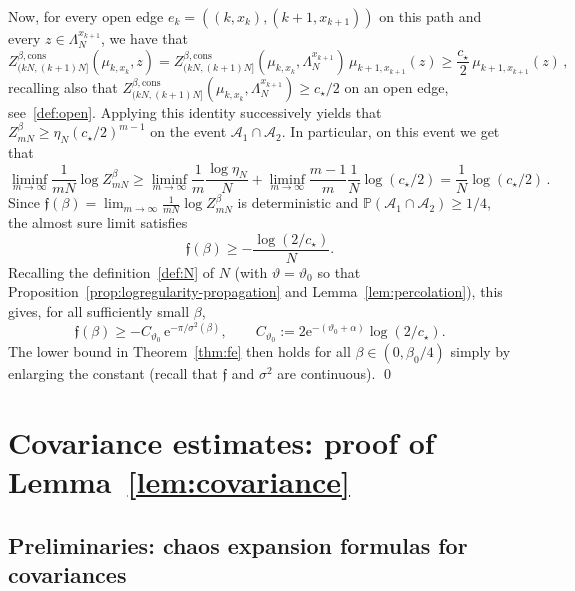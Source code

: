 \documentclass[11pt]{amsart}
\numberwithin{equation}{section}
\newcommand{\e}{\mathrm{e}}
\newcommand*{\tf}{\mathfrak{f}}
\newcommand*{\cons}{\mathrm{cons}}
\theoremstyle{plain}
\theoremstyle{definition}
\theoremstyle{remark}
\begin{document}
Now, for every open edge $e_k=((k,x_k),(k+1,x_{k+1}))$ on this path and every $z\in\Lambda_N^{x_{k+1}}$, we have that
$$
Z_{(kN,(k+1)N]}^{\beta,\cons}(\mu_{k,x_k},z)
=Z_{(kN,(k+1)N]}^{\beta,\cons}(\mu_{k,x_k},\Lambda_N^{x_{k+1}}) \, \mu_{k+1,x_{k+1}}(z)
\ge \frac{c_\star}{2}\, \mu_{k+1,x_{k+1}}(z) \,,
$$
recalling also that \(Z_{(kN,(k+1)N]}^{\beta,\cons}(\mu_{k,x_k},\Lambda_N^{x_{k+1}}) \geq c_{\star}/2\) on an open edge, see~\eqref{def:open}.
Applying this identity successively yields that \(Z_{mN}^{\beta} \ge \eta_N (c_{\star}/2)^{m-1}\) on the event $\mathcal A_1\cap \mathcal A_2$.
In particular, on this event we get that 
$$
\liminf_{m\to\infty} \frac{1}{mN} \log Z_{mN}^{\beta} \geq \liminf_{m\to\infty} \frac{1}{m} \frac{\log \eta_N}{ N} + \liminf_{m\to\infty} \frac{m-1}{m} \frac{1}{N}\log (c_{\star}/2) =\frac{1}{N}\log (c_{\star}/2) \,.
$$
Since $\tf(\beta) = \lim_{m\to\infty} \frac{1}{mN} \log Z_{mN}^{\beta}$ is deterministic and $\mathbb P(\mathcal A_1\cap \mathcal A_2)\geq 1/4$, the almost sure limit satisfies
$$
\tf(\beta) \geq -\frac{\log(2/c_\star)}{N}.
$$
Recalling the definition~\eqref{def:N} of $N$ (with \(\vartheta =\vartheta_0\) so that Proposition~\ref{prop:logregularity-propagation} and Lemma~\ref{lem:percolation}), this gives, for all sufficiently small $\beta$,
\[
\tf(\beta)\ge -C_{\vartheta_0} \,\e^{-\pi/\sigma^2(\beta)},
\qquad
C_{\vartheta_0}:=2\e^{-(\vartheta_0+\alpha)}\log(2/c_\star).
\]
The lower bound in Theorem~\ref{thm:fe} then holds for all \(\beta\in (0,\beta_0/4)\) simply by enlarging the constant (recall that \(\tf\) and \(\sigma^2\) are continuous).
\qed










\section{Covariance estimates: proof of Lemma~\ref{lem:covariance}}
\label{sec:covariances}



\subsection{Preliminaries: chaos expansion formulas for covariances}
\end{document}
